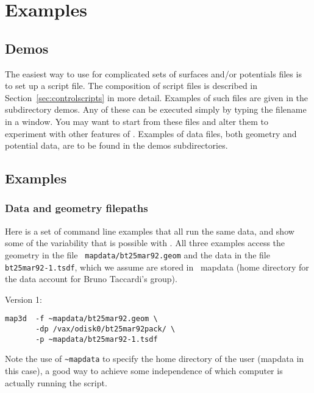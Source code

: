 \section{Examples}

\subsection{Demos}

The easiest way to use \map{} for complicated sets of surfaces and/or
potentials files is to set up a script file.  The composition of script
files is described in Section~\ref{sec:controlscripts} in more detail.
Examples of such files are given in the subdirectory demos.  Any of these
can be executed simply by typing the filename in a window.  You may want to
start from these files and alter them to experiment with other features of
\map{}.  Examples of data files, both geometry and potential data, are to
be found in the demos subdirectories.


\subsection{Examples}

\subsubsection{Data and geometry filepaths}

Here is a set of command line examples that all run the same data, and show
some of the variability that is possible with \map{}.  All three examples
access the geometry in the file {\tt ~mapdata/bt25mar92.geom} and the data
in the file {\tt bt25mar92-1.tsdf}, which we assume are stored in ~mapdata
(home directory for the data account for Bruno Taccardi's group).

\noindent
Version 1: 

\begin{verbatim}
map3d  -f ~mapdata/bt25mar92.geom \
       -dp /vax/odisk0/bt25mar92pack/ \
       -p ~mapdata/bt25mar92-1.tsdf
\end{verbatim}

Note the use of \verb=~mapdata= to specify the home directory of
the user (mapdata in this case), a good way to achieve some independence of
which computer is actually running the script.  

